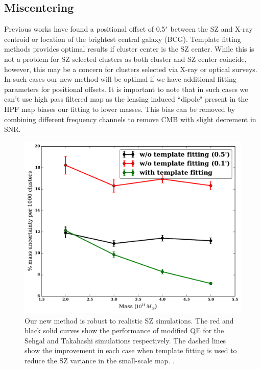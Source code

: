 {\subsection{Miscentering}
Previous works have found a positional offset of 0.5$^{\prime}$ between the SZ and X-ray centroid \citep{linden14} or location of the brightest central galaxy (BCG)\citep{song12b}.
Template fitting methods provides optimal results if cluster center is the SZ center.
While this is not a problem for SZ selected clusters as both cluster and SZ center coincide, however, this may be a concern for clusters selected via X-ray or optical surveys.
In such cases our new method will be optimal if we have additional fitting parameters for positional offsets.
It is important to note that in such cases we can't use high pass filtered map as the lensing induced ``dipole" present in the HPF map biases our fitting to lower masses. %
This bias can be removed by combining different frequency channels to remove CMB with slight decrement in SNR.
\begin{figure}[htb]
\includegraphics[width=\linewidth]{figs/miscentering_results.pdf}
 \caption{
Our new method is robust to realistic SZ simulations. 
The red and black solid curves show the performance of modified QE for the Sehgal and Takahashi simulations respectively. 
The dashed lines show the improvement in each case when template fitting is used to reduce the SZ variance in the small-scale map. 
 .
 }
\label{fig:realistic_sims}
\end{figure}

}
